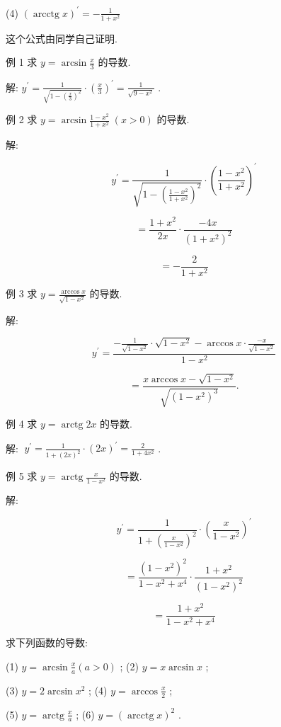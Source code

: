 \documentclass[lang=cn,newtx,12pt,scheme=chinese]{elegantbook}
\begin{document}
(4) \({\left( \operatorname{arcctg}x\right) }^{\prime } = - \frac{1}{1 + {x}^{2}}\)

这个公式由同学自己证明.

例 1 求 \(y = \arcsin \frac{x}{3}\) 的导数.

解: \({y}^{\prime } = \frac{1}{\sqrt{1 - {\left( \frac{x}{3}\right) }^{2}}} \cdot {\left( \frac{x}{3}\right) }^{\prime } = \frac{1}{\sqrt{9 - {x}^{2}}}\) .

例 2 求 \(y = \arcsin \frac{1 - {x}^{2}}{1 + {x}^{2}}\;\left( {x > 0}\right)\) 的导数.

解:

\[
{y}^{\prime } = \frac{1}{\sqrt{1 - {\left( \frac{1 - {x}^{2}}{1 + {x}^{2}}\right) }^{2}}} \cdot {\left( \frac{1 - {x}^{2}}{1 + {x}^{2}}\right) }^{\prime }
\]

\[
= \frac{1 + {x}^{2}}{2x} \cdot \frac{-{4x}}{{\left( 1 + {x}^{2}\right) }^{2}}
\]

\[
= - \frac{2}{1 + {x}^{2}}
\]

例 3 求 \(y = \frac{\arccos x}{\sqrt{1 - {x}^{2}}}\) 的导数.

解:

\[
{y}^{\prime } = \frac{-\frac{1}{\sqrt{1 - {x}^{2}}} \cdot \sqrt{1 - {x}^{2}} - \arccos x \cdot \frac{-x}{\sqrt{1 - {x}^{2}}}}{1 - {x}^{2}}
\]

\[
= \frac{x\arccos x - \sqrt{1 - {x}^{2}}}{\sqrt{{\left( 1 - {x}^{2}\right) }^{3}}}.
\]

例 4 求 \(y = \operatorname{arctg}{2x}\) 的导数.

解: \(\;{y}^{\prime } = \frac{1}{1 + {\left( 2x\right) }^{2}} \cdot {\left( 2x\right) }^{\prime } = \frac{2}{1 + 4{x}^{2}}\) .

例 5 求 \(y = \operatorname{arctg}\frac{x}{1 - {x}^{2}}\) 的导数.

解:

\[
{y}^{\prime } = \frac{1}{1 + {\left( \frac{x}{1 - {x}^{2}}\right) }^{2}} \cdot {\left( \frac{x}{1 - {x}^{2}}\right) }^{\prime }
\]

\[
= \frac{{\left( 1 - {x}^{2}\right) }^{2}}{1 - {x}^{2} + {x}^{4}} \cdot \frac{1 + {x}^{2}}{{\left( 1 - {x}^{2}\right) }^{2}}
\]

\[
= \frac{1 + {x}^{2}}{1 - {x}^{2} + {x}^{4}}
\]

\begin{problemset}[练习]

\item 求下列函数的导数:

(1) \(y = \arcsin \frac{x}{a}\left( {a > 0}\right)\) ; (2) \(y = x\arcsin x\) ;

(3) \(y = 2\arcsin {x}^{2}\) ; (4) \(y = \arccos \frac{x}{2}\) ;

(5) \(y = \operatorname{arctg}\frac{x}{a}\) ; (6) \(y = {\left( \operatorname{arcctg}x\right) }^{2}\) .

\end{problemset}
\end{document}
